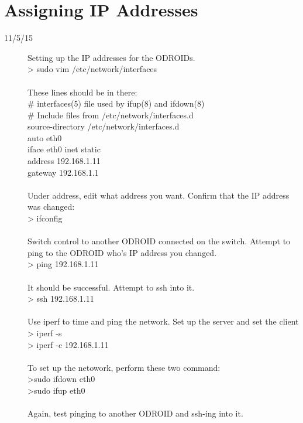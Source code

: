 \section{Assigning IP Addresses}
\begin{description}
\item [11/5/15] Setting up the IP addresses for the ODROIDs. \\
> sudo vim /etc/network/interfaces \\ \\
These lines should be in there: \\
\# interfaces(5) file used by ifup(8) and ifdown(8) \\
\# Include files from /etc/network/interfaces.d \\
source-directory /etc/network/interfaces.d \\
auto eth0 \\
iface eth0 inet static \\
address 192.168.1.11 \\
gateway 192.168.1.1 \\ \\
Under address, edit what address you want. Confirm that the IP address was changed: \\
> ifconfig \\ \\
Switch control to another ODROID connected on the switch. Attempt to ping to the ODROID who's IP address you changed. \\
> ping 192.168.1.11 \\ \\
It should be successful. Attempt to ssh into it. \\
> ssh 192.168.1.11 \\ \\
Use iperf to time and ping the network. Set up the server and set the client \\
> iperf -s \\
> iperf -c 192.168.1.11 \\ \\
To set up the netowork, perform these two command: \\
>sudo ifdown eth0 \\
>sudo ifup eth0 \\ \\
Again, test pinging to another ODROID and ssh-ing into it. \\
\end{description}

